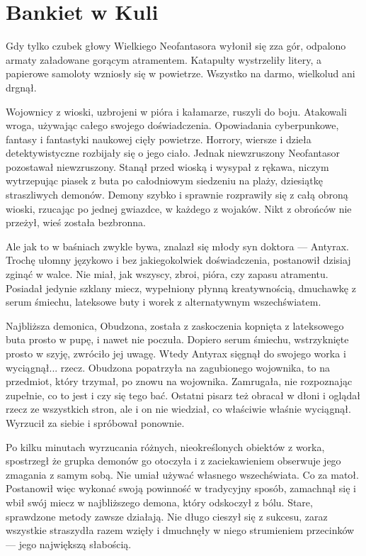 \chapter{Bankiet w Kuli}


Gdy tylko czubek głowy Wielkiego Neofantasora wyłonił się zza gór, odpalono armaty załadowane gorącym atramentem.
Katapulty wystrzeliły litery, a papierowe samoloty wzniosły się w powietrze.
Wszystko na darmo, wielkolud ani drgnął.

Wojownicy z wioski, uzbrojeni w pióra i kałamarze, ruszyli do boju.
Atakowali wroga, używając całego swojego doświadczenia. Opowiadania cyberpunkowe, fantasy i fantastyki naukowej cięły powietrze.
Horrory, wiersze i dzieła detektywistyczne rozbijały się o jego ciało.
Jednak niewzruszony Neofantasor pozostawał niewzruszony.
Stanął przed wioską i wysypał z rękawa, niczym wytrzepując piasek z buta po całodniowym siedzeniu na plaży, dziesiątkę straszliwych demonów.
Demony szybko i sprawnie rozprawiły się z całą obroną wioski, rzucając po jednej gwiazdce, w każdego z wojaków.
Nikt z obrońców nie przeżył, wieś została bezbronna.

Ale jak to w baśniach zwykle bywa, znalazł się młody syn doktora --- Antyrax.
Trochę ułomny językowo i bez jakiegokolwiek doświadczenia, postanowił dzisiaj zginąć w walce.
Nie miał, jak wszyscy, zbroi, pióra, czy zapasu atramentu.
Posiadał jedynie szklany miecz, wypełniony płynną kreatywnością, dmuchawkę z serum śmiechu, lateksowe buty i worek z alternatywnym wszechświatem.

Najbliższa demonica, Obudzona, została z zaskoczenia kopnięta z lateksowego buta prosto w pupę, i nawet nie poczuła.
Dopiero serum śmiechu, wstrzyknięte prosto w szyję, zwróciło jej uwagę.
Wtedy Antyrax sięgnął do swojego worka i wyciągnął... rzecz.
Obudzona popatrzyła na zagubionego wojownika, to na przedmiot, który trzymał, po znowu na wojownika. Zamrugała, nie rozpoznając zupełnie, co to jest i czy się tego bać.
Ostatni pisarz też obracał w dłoni i oglądał rzecz ze wszystkich stron, ale i on nie wiedział, co właściwie właśnie wyciągnął.
Wyrzucił za siebie i spróbował ponownie.

Po kilku minutach wyrzucania różnych, nieokreślonych obiektów z worka, spostrzegł że grupka demonów go otoczyła i z zaciekawieniem obserwuje jego zmagania z samym sobą.
Nie umiał używać własnego wszechświata. Co za matoł.
Postanowił więc wykonać swoją powinność w tradycyjny sposób, zamachnął się i wbił swój miecz w najbliższego demona, który odskoczył z bólu. Stare, sprawdzone metody zawsze działają.
Nie długo cieszył się z sukcesu, zaraz wszystkie straszydła razem wzięły i dmuchnęły w niego strumieniem przecinków --- jego największą słabością.

